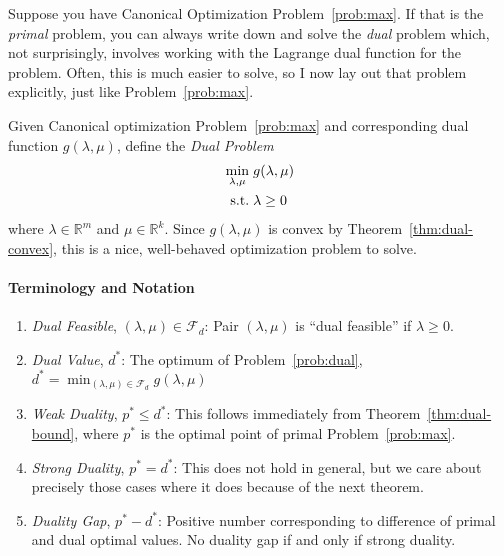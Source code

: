 \documentclass[12pt]{article}
\numberwithin{equation}{section} %
\theoremstyle{plain}
\theoremstyle{definition}
\theoremstyle{remark}
\newcommand{\R}{\mathbb{R}}
\begin{document}
Suppose you have Canonical Optimization Problem~\ref{prob:max}. If that
is the \emph{primal} problem, you can always write down and solve the
\emph{dual} problem which, not surprisingly, involves working with the
Lagrange dual function for the problem. Often, this is much easier to
solve, so I now lay out that problem explicitly, just like
Problem~\ref{prob:max}.

Given Canonical optimization Problem~\ref{prob:max} and corresponding
dual function $g(\lambda,\mu)$, define the \emph{Dual Problem}
\begin{align}
  \label{prob:dual}
  \min_{\lambda,\mu} \; &g(\lambda,\mu) \\
  \text{s.t.} \; &\lambda \geq 0\notag
\end{align}
where $\lambda\in\R^m$ and $\mu\in\R^k$.
Since $g(\lambda,\mu)$ is convex by Theorem~\ref{thm:dual-convex}, this
is a nice, well-behaved optimization problem to solve.

\paragraph{Terminology and Notation}
\begin{enumerate}
  \item \emph{Dual Feasible}, $(\lambda,\mu)\in\mathscr{F}_d$: Pair
    $(\lambda,\mu)$ is ``dual feasible'' if $\lambda\geq 0$.
  \item \emph{Dual Value}, $d^*$: The optimum of
    Problem~\ref{prob:dual}, $d^* = \min_{(\lambda,\mu)\in\mathscr{F}_d}
    g(\lambda,\mu)$
  \item \emph{Weak Duality}, $p^*\leq d^*$: This follows immediately
    from Theorem~\ref{thm:dual-bound}, where $p^*$ is the optimal point
    of primal Problem~\ref{prob:max}.
  \item \emph{Strong Duality}, $p^*=d^*$: This does not hold in general,
    but we care about precisely those cases where it does because of the
    next theorem.
  \item \emph{Duality Gap}, $p^*-d^*$: Positive number corresponding to
    difference of primal and dual optimal values. No duality gap if and
    only if strong duality.
\end{enumerate}
\end{document}
